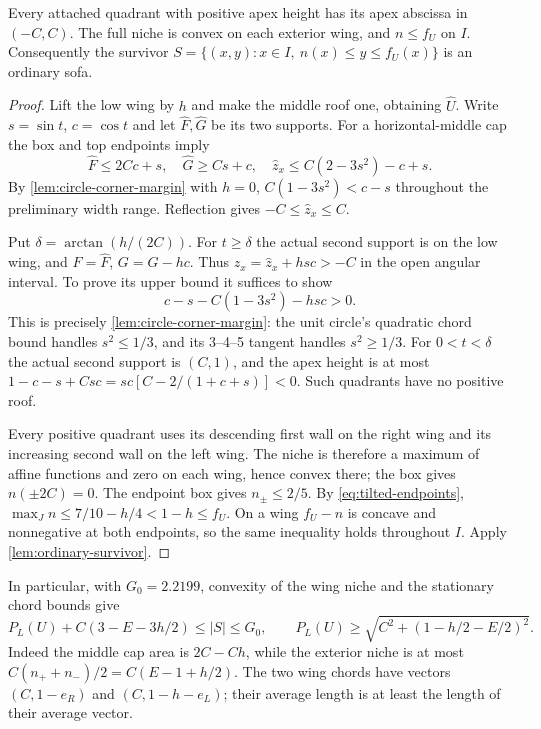 \begin{lemma}\label{lem:tilted-box-confinement}
Every attached quadrant with positive apex height has its apex
abscissa in $(-C,C)$. The full niche is convex on each exterior
wing, and $n\le f_U$ on $I$. Consequently the survivor
$S=\{(x,y):x\in I,\ n(x)\le y\le f_U(x)\}$ is an ordinary sofa.
\end{lemma}
\begin{proof}
Lift the low wing by $h$ and make the middle roof one, obtaining
$\widehat U$. Write $s=\sin t$, $c=\cos t$ and let
$\widehat F,\widehat G$ be its two supports.
For a horizontal-middle cap the box and top endpoints imply
\[
 \widehat F\le2Cc+s,\quad\widehat G\ge Cs+c,
 \quad\widehat z_x\le C(2-3s^2)-c+s.
\]
By \cref{lem:circle-corner-margin} with $h=0$,
$C(1-3s^2)<c-s$ throughout the preliminary width range.
Reflection gives $-C\le\widehat z_x\le C$.

Put $\delta=\arctan(h/(2C))$. For $t\ge\delta$ the actual
second support is on the low wing, and
$F=\widehat F$, $G=\widehat G-hc$.
Thus $z_x=\widehat z_x+hsc>-C$ in the open angular interval.
To prove its upper bound it suffices to show
\begin{equation}\label{eq:tilted-corner-margin}
 c-s-C(1-3s^2)-hsc>0.
\end{equation}
This is precisely \cref{lem:circle-corner-margin}: the unit circle's
quadratic chord bound handles $s^2\le1/3$, and its 3--4--5 tangent
handles $s^2\ge1/3$.
For $0<t<\delta$ the actual second support is $(C,1)$, and the
apex height is at most
$1-c-s+Csc=sc[C-2/(1+c+s)]<0$.
Such quadrants have no positive roof.

Every positive quadrant uses its descending first wall on the right
wing and its increasing second wall on the left wing.
The niche is therefore a maximum of affine functions and zero on
each wing, hence convex there; the box gives $n(\pm2C)=0$.
The endpoint box gives $n_\pm\le2/5$.
By \eqref{eq:tilted-endpoints},
$\max_J n\le7/10-h/4<1-h\le f_U$.
On a wing $f_U-n$ is concave and nonnegative at both endpoints,
so the same inequality holds throughout $I$.
Apply \cref{lem:ordinary-survivor}.
\end{proof}

In particular, with $G_0=2.2199$, convexity of the wing niche
and the stationary chord bounds give
\begin{equation}\label{eq:tilted-ordinary-bound}
 P_L(U)+C(3-E-3h/2)\le |S|\le G_0,\qquad
 P_L(U)\ge\sqrt{C^2+(1-h/2-E/2)^2}.
\end{equation}
Indeed the middle cap area is $2C-Ch$, while the exterior niche
is at most $C(n_++n_-)/2=C(E-1+h/2)$.
The two wing chords have vectors $(C,1-e_R)$ and
$(C,1-h-e_L)$; their average length is at least the length of
their average vector.


